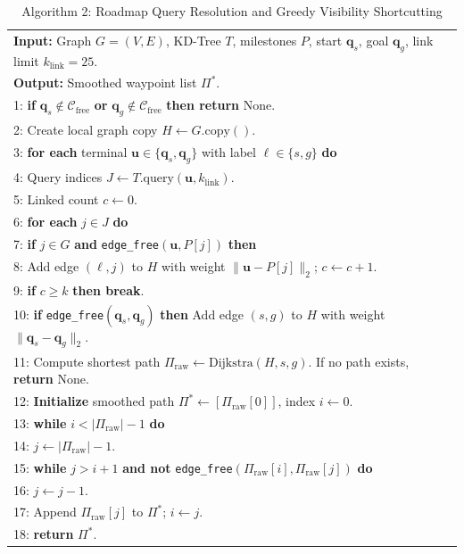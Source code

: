 \documentclass[12pt,a4paper]{article}
\begin{document}
\begin{table}[H]
\centering
\caption{Algorithm 2: Roadmap Query Resolution and Greedy Visibility Shortcutting}
\label{alg:prm_query}
{\small
\begin{tabular}{|p{\dimexpr\linewidth-2\tabcolsep-2\arrayrulewidth\relax}|}
\hline
\textbf{Input:} Graph $G=(V, E)$, KD-Tree $T$, milestones $P$, start $\mathbf{q}_s$, goal $\mathbf{q}_g$, link limit $k_{\text{link}} = 25$. \\
\textbf{Output:} Smoothed waypoint list $\Pi^*$. \\ \hline
1: \textbf{if} $\mathbf{q}_s \notin \mathcal{C}_{\text{free}}$ \textbf{or} $\mathbf{q}_g \notin \mathcal{C}_{\text{free}}$ \textbf{then return} $\text{None}$. \\
2: Create local graph copy $H \leftarrow G.\text{copy}()$. \\
3: \textbf{for each} terminal $\mathbf{u} \in \{\mathbf{q}_s, \mathbf{q}_g\}$ with label $\ell \in \{s, g\}$ \textbf{do} \\
4: \quad Query indices $J \leftarrow T.\text{query}(\mathbf{u}, k_{\text{link}})$. \\
5: \quad Linked count $c \leftarrow 0$. \\
6: \quad \textbf{for each} $j \in J$ \textbf{do} \\
7: \qquad \textbf{if} $j \in G$ \textbf{and} \texttt{edge\_free}$(\mathbf{u}, P[j])$ \textbf{then} \\
8: \qquad \quad Add edge $(\ell, j)$ to $H$ with weight $\|\mathbf{u} - P[j]\|_2$; $c \leftarrow c + 1$. \\
9: \qquad \quad \textbf{if} $c \geq k$ \textbf{then break}. \\
10: \textbf{if} \texttt{edge\_free}$(\mathbf{q}_s, \mathbf{q}_g)$ \textbf{then} Add edge $(s, g)$ to $H$ with weight $\|\mathbf{q}_s - \mathbf{q}_g\|_2$. \\
11: Compute shortest path $\Pi_{\text{raw}} \leftarrow \text{Dijkstra}(H, s, g)$. If no path exists, \textbf{return} $\text{None}$. \\
12: %
\textbf{Initialize} smoothed path $\Pi^* \leftarrow [\Pi_{\text{raw}}[0]]$, index $i \leftarrow 0$. \\
13: \textbf{while} $i < |\Pi_{\text{raw}}| - 1$ \textbf{do} \\
14: \quad $j \leftarrow |\Pi_{\text{raw}}| - 1$. \\
15: \quad \textbf{while} $j > i + 1$ \textbf{and not} \texttt{edge\_free}$(\Pi_{\text{raw}}[i], \Pi_{\text{raw}}[j])$ \textbf{do} \\
16: \qquad $j \leftarrow j - 1$. \\
17: \quad Append $\Pi_{\text{raw}}[j]$ to $\Pi^*$; $i \leftarrow j$. \\
18: \textbf{return} $\Pi^*$. \\ \hline
\end{tabular}
}
\end{table}
\end{document}

